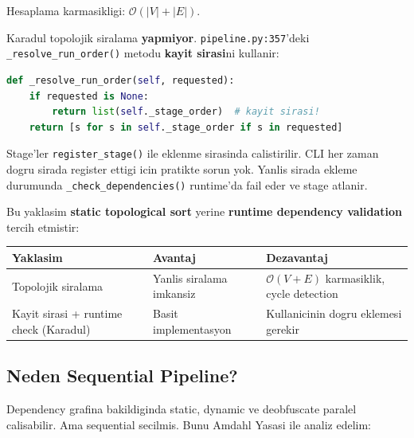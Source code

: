 \documentclass[12pt,a4paper,oneside]{book}
\theoremstyle{definition}
\newcommand{\code}[1]{\texttt{\color{green!60!white}#1}}
\newcommand{\file}[1]{\texttt{\color{yellow!70!white}#1}}
\newcommand{\bigO}[1]{\mathcal{O}\!\left(#1\right)}
\begin{document}
Hesaplama karmasikligi: $\bigO{|V| + |E|}$.

\begin{tanim}
Karadul topolojik siralama \textbf{yapmiyor}. \file{pipeline.py:357}'deki \code{\_resolve\_run\_order()} metodu \textbf{kayit sirasi}ni kullanir:
\begin{lstlisting}[language=Python]
def _resolve_run_order(self, requested):
    if requested is None:
        return list(self._stage_order)  # kayit sirasi!
    return [s for s in self._stage_order if s in requested]
\end{lstlisting}
Stage'ler \code{register\_stage()} ile eklenme sirasinda calistirilir. CLI her zaman dogru sirada register ettigi icin pratikte sorun yok. Yanlis sirada ekleme durumunda \code{\_check\_dependencies()} runtime'da fail eder ve stage atlanir.
\end{tanim}

Bu yaklasim \textbf{static topological sort} yerine \textbf{runtime dependency validation} tercih etmistir:

\begin{table}[ht]
\centering
\begin{tabular}{p{5cm}p{4cm}p{4cm}}
\toprule
\textbf{\color{sectioncyan}Yaklasim} & \textbf{\color{sectioncyan}Avantaj} & \textbf{\color{sectioncyan}Dezavantaj} \\
\midrule
Topolojik siralama & Yanlis siralama imkansiz & $\bigO{V+E}$ karmasiklik, cycle detection \\
Kayit sirasi + runtime check (Karadul) & Basit implementasyon & Kullanicinin dogru eklemesi gerekir \\
\bottomrule
\end{tabular}
\end{table}

\subsection{Neden Sequential Pipeline?}

Dependency grafina bakildiginda static, dynamic ve deobfuscate paralel calisabilir. Ama sequential secilmis. Bunu Amdahl Yasasi ile analiz edelim:
\end{document}
